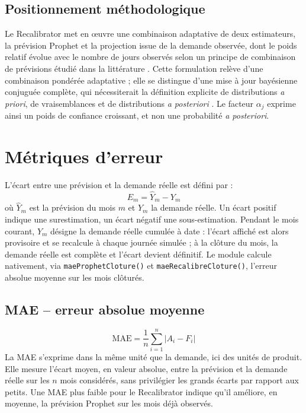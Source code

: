 \documentclass[11pt,a4paper]{article}
\newcommand{\code}[1]{\texttt{#1}}
\begin{document}
\subsection{Positionnement méthodologique}

Le Recalibrator met en \oe uvre une combinaison adaptative de deux estimateurs, la prévision Prophet et la projection issue de la demande observée, dont le poids relatif évolue avec le nombre de jours observés selon un principe de combinaison de prévisions étudié dans la littérature \cite{batesgranger1969,timmermann2006}. Cette formulation relève d'une combinaison pondérée adaptative ; elle se distingue d'une mise à jour bayésienne conjuguée complète, qui nécessiterait la définition explicite de distributions \emph{a priori}, de vraisemblances et de distributions \emph{a posteriori} \cite{brown1956,holtwinters1960}. Le facteur \(\alpha_j\) exprime ainsi un poids de confiance croissant, et non une probabilité \emph{a posteriori}.

\section{Métriques d'erreur}
\label{sec:ecarts-indicateurs}

L'écart entre une prévision et la demande réelle est défini par :
\[
E_m = \widehat{Y}_m - Y_m
\]
où \(\widehat{Y}_m\) est la prévision du mois \(m\) et \(Y_m\) la demande réelle. Un écart positif indique une surestimation, un écart négatif une sous-estimation. Pendant le mois courant, \(Y_m\) désigne la demande réelle cumulée à date : l'écart affiché est alors provisoire et se recalcule à chaque journée simulée ; à la clôture du mois, la demande réelle est complète et l'écart devient définitif. Le module calcule nativement, via \code{maeProphetCloture()} et \code{maeRecalibreCloture()}, l'erreur absolue moyenne sur les mois clôturés.

\subsection{MAE -- erreur absolue moyenne}
\[
\mathrm{MAE} = \frac{1}{n}\sum_{i=1}^{n} |A_i - F_i|
\]
La MAE s'exprime dans la même unité que la demande, ici des unités de produit. Elle mesure l'écart moyen, en valeur absolue, entre la prévision et la demande réelle sur les \(n\) mois considérés, sans privilégier les grands écarts par rapport aux petits. Une MAE plus faible pour le Recalibrator indique qu'il améliore, en moyenne, la prévision Prophet sur les mois déjà observés.
\end{document}
